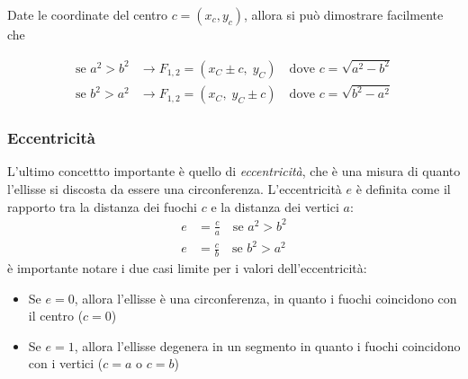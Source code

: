 Date le coordinate del centro $ c = \left(x_c, y_c\right) $, allora si può dimostrare facilmente che

\[
	\begin{aligned}
		\text{se } a^2 > b^2 & \to F_{1,2} = (x_C \pm c,\; y_C) \quad \text{dove } c = \sqrt{a^2 - b^2} \\
		\text{se } b^2 > a^2 & \to F_{1,2} = (x_C,\; y_C \pm c) \quad \text{dove } c = \sqrt{b^2 - a^2}
	\end{aligned}
\]
\subsubsection{Eccentricità}
L'ultimo concettto importante è quello di \textit{eccentricità}, che è una misura di quanto l'ellisse si discosta da essere una circonferenza. L'eccentricità $ e $ è definita come il rapporto tra la distanza dei fuochi $ c $ e la distanza dei vertici $ a $:
\[
	\begin{aligned}
		e & = \frac{c}{a} \quad \text{se } a^2 > b^2 \\
		e & = \frac{c}{b} \quad \text{se } b^2 > a^2
	\end{aligned}
\]
è importante notare i due casi limite per i valori dell'eccentricità:
\begin{itemize}
	\item Se $ e = 0 $, allora l'ellisse è una circonferenza, in quanto i fuochi coincidono con il centro ($ c=0 $)
	\item Se $ e = 1 $, allora l'ellisse degenera in un segmento in quanto i fuochi coincidono con i vertici ($ c=a $ o $ c=b $)
\end{itemize}

